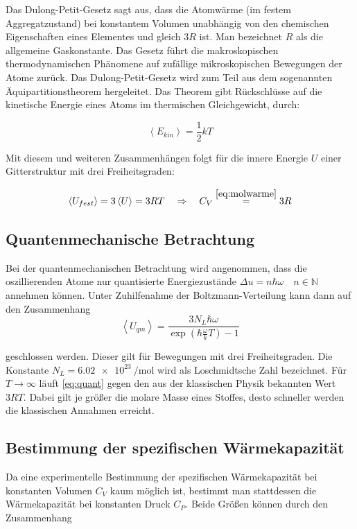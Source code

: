 Das Dulong-Petit-Gesetz sagt aus, dass die Atomwärme (im festem Aggregatzustand) bei %
konstantem Volumen unabhängig von den chemischen Eigenschaften eines Elementes
und gleich $3R$ ist. %
Man bezeichnet $R$ als die allgemeine Gaskonstante. %
Das Gesetz führt die makroskopischen thermodynamischen Phänomene
auf zufällige mikroskopischen Bewegungen der Atome zurück. %
Das Dulong-Petit-Gesetz wird zum Teil aus dem %
sogenannten Äquipartitionstheorem hergeleitet.
Das Theorem gibt Rückschlüsse auf die kinetische Energie eines Atoms %
im thermischen Gleichgewicht, durch:

\begin{equation*}
\left< E_{kin} \right>=\frac{1}{2}kT
\end{equation*}

Mit diesem und weiteren Zusammenhängen folgt für die innere Energie $U$ %
einer Gitterstruktur mit drei Freiheitsgraden:

\begin{equation*}
\left< U_{fest} \right> = 3 \left< U \right>=3RT \quad \Rightarrow \quad C_{V}\overset{\eqref{eq:molwarme}}{=}3R
\end{equation*}

\subsection{Quantenmechanische Betrachtung}
Bei der quantenmechanischen Betrachtung wird angenommen,
dass die oszillierenden Atome nur quantisierte Energiezustände $\Delta u=n\hbar \omega \quad n\in\mathbb{N}$
annehmen können.
Unter Zuhilfenahme der Boltzmann-Verteilung kann dann auf den Zusammenhang  %
\begin{equation}
\label{eq:quant}
\left< U_{qm} \right> =\frac{3N_L \hbar \omega}{\exp\left(\hbar \frac{\omega}{k} T\right) -1}
\end{equation}

geschlossen werden. Dieser gilt für Bewegungen mit drei Freiheitsgraden.
Die Konstante $N_L = \SI{6.02e23}{\per\mol}$ wird als Loschmidtsche Zahl bezeichnet.
Für $T\to\infty$ läuft \eqref{eq:quant} gegen den aus der klassischen Physik bekannten Wert %
$3RT$.
Dabei gilt je größer die molare Masse eines Stoffes, desto schneller werden die klassischen Annahmen erreicht.

\subsection{Bestimmung der spezifischen Wärmekapazität}
Da eine experimentelle Bestimmung der spezifischen Wärmekapazität
bei konstanten Volumen $C_V$ kaum möglich ist, %
bestimmt man stattdessen die Wärmekapazität bei konstanten Druck $C_P$. %
Beide Größen können durch den Zusammenhang %

